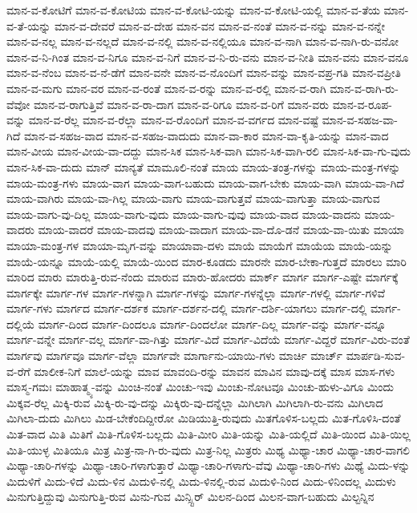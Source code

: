 {ಮಾನ-ವ-ಕೋಟಿಗೆ
ಮಾನ-ವ-ಕೋಟಿಯ
ಮಾನ-ವ-ಕೋಟಿ-ಯನ್ನು
ಮಾನ-ವ-ಕೋಟಿ-ಯಲ್ಲಿ
ಮಾನ-ವ-ತೆಯ
ಮಾನ-ವ-ತೆ-ಯನ್ನು
ಮಾನ-ವ-ದೇವರೆ
ಮಾನ-ವ-ದೇಹ
ಮಾನ-ವನ
ಮಾನ-ವ-ನಂತೆ
ಮಾನ-ವ-ನನ್ನು
ಮಾನ-ವ-ನನ್ನೇ
ಮಾನ-ವ-ನಲ್ಲ
ಮಾನ-ವ-ನಲ್ಲದೆ
ಮಾನ-ವ-ನಲ್ಲಿ
ಮಾನ-ವ-ನಲ್ಲಿಯೂ
ಮಾನ-ವ-ನಾಗಿ
ಮಾನ-ವ-ನಾಗಿ-ರು-ವನೋ
ಮಾನ-ವ-ನಿ-ಗಿಂತ
ಮಾನ-ವ-ನಿಗೂ
ಮಾನ-ವ-ನಿಗೆ
ಮಾನ-ವ-ನಿ-ರು-ವನು
ಮಾನ-ವ-ನೀತಿ
ಮಾನ-ವನು
ಮಾನ-ವನೂ
ಮಾನ-ವ-ನೆಂಬ
ಮಾನ-ವ-ನೆ-ಡೆಗೆ
ಮಾನ-ವನೇ
ಮಾನ-ವ-ನೊಂದಿಗೆ
ಮಾನ-ವನ್ನು
ಮಾನ-ವಪ್ರ-ಗತಿ
ಮಾನ-ವಪ್ರೀತಿ
ಮಾನ-ವ-ಮಗು
ಮಾನ-ವರ
ಮಾನ-ವ-ರಂತೆ
ಮಾನ-ವ-ರನ್ನು
ಮಾನ-ವ-ರಲ್ಲಿ
ಮಾನ-ವ-ರಾಗಿ
ಮಾನ-ವ-ರಾಗಿ-ರು-ವೆವೋ
ಮಾನ-ವ-ರಾಗುತ್ತಿವೆ
ಮಾನ-ವ-ರಾ-ದಾಗ
ಮಾನ-ವ-ರಿಗೂ
ಮಾನ-ವ-ರಿಗೆ
ಮಾನ-ವರು
ಮಾನ-ವ-ರೂಪ-ವನ್ನು
ಮಾನ-ವ-ರೆಲ್ಲ
ಮಾನ-ವ-ರೆಲ್ಲಾ
ಮಾನ-ವ-ರೊಂದಿಗೆ
ಮಾನ-ವ-ವರ್ಗದ
ಮಾನ-ವಷ್ಟೆ
ಮಾನ-ವ-ಸಹಜ-ವಾ-ಗಿದೆ
ಮಾನ-ವ-ಸಹಜ-ವಾದ
ಮಾನ-ವ-ಸಹಜ-ವಾದುದು
ಮಾನ-ವಾ-ಕಾರ
ಮಾನ-ವಾ-ಕೃತಿ-ಯನ್ನು
ಮಾನ-ವಾದ
ಮಾನ-ವೀಯ
ಮಾನ-ವೀಯ-ವಾ-ದದ್ದು
ಮಾನ-ಸಿಕ
ಮಾನ-ಸಿಕ-ವಾಗಿ
ಮಾನ-ಸಿಕ-ವಾಗಿ-ರಲಿ
ಮಾನ-ಸಿಕ-ವಾ-ಗು-ವುದು
ಮಾನ-ಸಿಕ-ವಾ-ದುದು
ಮಾನ್
ಮಾನ್ಯತೆ
ಮಾಮೂಲಿ-ನಂತೆ
ಮಾಯ
ಮಾಯ-ತಂತ್ರ-ಗಳನ್ನು
ಮಾಯ-ಮಂತ್ರ-ಗಳನ್ನು
ಮಾಯ-ಮಂತ್ರ-ಗಳು
ಮಾಯ-ವಾಗ
ಮಾಯ-ವಾಗ-ಬಹುದು
ಮಾಯ-ವಾಗ-ಬೇಕು
ಮಾಯ-ವಾಗಿ
ಮಾಯ-ವಾ-ಗಿದೆ
ಮಾಯ-ವಾಗಿರು
ಮಾಯ-ವಾ-ಗಿಲ್ಲ
ಮಾಯ-ವಾಗು
ಮಾಯ-ವಾಗುತ್ತವೆ
ಮಾಯ-ವಾಗುತ್ತಾ
ಮಾಯ-ವಾಗುವ
ಮಾಯ-ವಾಗು-ವು-ದಿಲ್ಲ
ಮಾಯ-ವಾಗು-ವುದು
ಮಾಯ-ವಾಗು-ವುವು
ಮಾಯ-ವಾದ
ಮಾಯ-ವಾದನು
ಮಾಯ-ವಾದರು
ಮಾಯ-ವಾದರೆ
ಮಾಯ-ವಾದವು
ಮಾಯ-ವಾದಾಗ
ಮಾಯ-ವಾ-ದೊ-ಡನೆ
ಮಾಯ-ವಾ-ಯಿತು
ಮಾಯಾ
ಮಾಯಾ-ಮಂತ್ರ-ಗಳ
ಮಾಯಾ-ಮೃಗ-ವನ್ನು
ಮಾಯಾವಾ-ದಳು
ಮಾಯೆ
ಮಾಯೆಗೆ
ಮಾಯೆಯ
ಮಾಯೆ-ಯನ್ನು
ಮಾಯೆ-ಯನ್ನೂ
ಮಾಯೆ-ಯಲ್ಲಿ
ಮಾಯೆ-ಯಿಂದ
ಮಾರ-ಕೂಡದು
ಮಾರನೇ
ಮಾರ-ಬೇಕಾ-ಗುತ್ತದೆ
ಮಾರಲು
ಮಾರಿ
ಮಾರಿದ
ಮಾರು
ಮಾರುತ್ತಿ-ರುವ-ನೆಂದು
ಮಾರುವ
ಮಾರು-ಹೋದರು
ಮಾರ್ಕ್
ಮಾರ್ಗ
ಮಾರ್ಗ-ಎಷ್ಟೇ
ಮಾರ್ಗಕ್ಕೆ
ಮಾರ್ಗಕ್ಕೇ
ಮಾರ್ಗ-ಗಳ
ಮಾರ್ಗ-ಗಳನ್ನಾಗಿ
ಮಾರ್ಗ-ಗಳನ್ನು
ಮಾರ್ಗ-ಗಳನ್ನೆಲ್ಲಾ
ಮಾರ್ಗ-ಗಳಲ್ಲಿ
ಮಾರ್ಗ-ಗಳಿವೆ
ಮಾರ್ಗ-ಗಳು
ಮಾರ್ಗದ
ಮಾರ್ಗ-ದರ್ಶಕ
ಮಾರ್ಗ-ದರ್ಶನ-ದಲ್ಲಿ
ಮಾರ್ಗ-ದರ್ಶಿ-ಯಾಗಲು
ಮಾರ್ಗ-ದಲ್ಲಿ
ಮಾರ್ಗ-ದಲ್ಲಿಯೆ
ಮಾರ್ಗ-ದಿಂದ
ಮಾರ್ಗ-ದಿಂದಲೂ
ಮಾರ್ಗ-ದಿಂದಲೋ
ಮಾರ್ಗ-ದಿಲ್ಲ
ಮಾರ್ಗ-ವನ್ನು
ಮಾರ್ಗ-ವನ್ನೂ
ಮಾರ್ಗ-ವನ್ನೇ
ಮಾರ್ಗ-ವಲ್ಲ
ಮಾರ್ಗ-ವಾ-ಗಿತ್ತು
ಮಾರ್ಗ-ವಿದೆ
ಮಾರ್ಗ-ವಿದೆಯೆ
ಮಾರ್ಗ-ವಿದ್ದರೆ
ಮಾರ್ಗ-ವಿರು-ವಂತೆ
ಮಾರ್ಗವು
ಮಾರ್ಗವೂ
ಮಾರ್ಗ-ವೆಲ್ಲಾ
ಮಾರ್ಗವೇ
ಮಾರ್ಗಾನು-ಯಾಯಿ-ಗಳು
ಮಾರ್ಚಿ
ಮಾರ್ಚ್
ಮಾರ್ಪಡಿ-ಸುವ-ವ-ರೆಗೆ
ಮಾಲೀಕ-ನಿಗೆ
ಮಾಲೆ-ಯನ್ನು
ಮಾವ
ಮಾವಂದಿ-ರನ್ನು
ಮಾವನ
ಮಾವಿನ
ಮಾವು-ದಕ್ಕೆ
ಮಾಸ
ಮಾಸ-ಗಳು
ಮಾಸ್ಮ-ಗಮಃ
ಮಾಹಾತ್ಮ್ಯ-ವನ್ನು
ಮಿಂಚಿ-ನಂತೆ
ಮಿಂಚು-ಇವು
ಮಿಂಚು-ನೋಟವೂ
ಮಿಂಚು-ಹುಳು-ವಿಗೂ
ಮಿಂದು
ಮಿಕ್ಕವ-ರೆಲ್ಲ
ಮಿಕ್ಕಿ-ರುವ
ಮಿಕ್ಕಿ-ರು-ವು-ದನ್ನು
ಮಿಕ್ಕಿರು-ವು-ದನ್ನೆಲ್ಲಾ
ಮಿಗಿಲಾಗಿ
ಮಿಗಿಲಾಗಿ-ರು-ವನು
ಮಿಗಿಲಾದ
ಮಿಗಿಲಾ-ದುದು
ಮಿಗಿಲು
ಮಿಡ-ಬೇಕೆಂದಿದ್ದೀರೋ
ಮಿಡಿಯುತ್ತಿ-ರುವುದು
ಮಿತಗೊಳಿಸ-ಬಲ್ಲದು
ಮಿತ-ಗೊಳಿಸಿ-ದಂತೆ
ಮಿತ-ವಾದ
ಮಿತಿ
ಮಿತಿಗೆ
ಮಿತಿ-ಗೊಳಿಸ-ಬಲ್ಲದು
ಮಿತಿ-ಮೀರಿ
ಮಿತಿ-ಯನ್ನು
ಮಿತಿ-ಯಲ್ಲಿದೆ
ಮಿತಿ-ಯಿಂದ
ಮಿತಿ-ಯಿಲ್ಲ
ಮಿತಿ-ಯುಳ್ಳ
ಮಿತಿಯೂ
ಮಿತ್ರ
ಮಿತ್ರ-ನಾ-ಗಿ-ರು-ವುದು
ಮಿತ್ರ-ನಿಲ್ಲ
ಮಿತ್ರರು
ಮಿಥ್ಯ
ಮಿಥ್ಯಾ-ಚಾರ
ಮಿಥ್ಯಾ-ಚಾರ-ವಾಗಲಿ
ಮಿಥ್ಯಾ-ಚಾರಿ-ಗಳನ್ನು
ಮಿಥ್ಯಾ-ಚಾರಿ-ಗಳಾಗುತ್ತಾರೆ
ಮಿಥ್ಯಾ-ಚಾರಿ-ಗಳಾಗು-ವೆವು
ಮಿಥ್ಯಾ-ಚಾರಿ-ಗಳು
ಮಿಥ್ಯೆ
ಮಿದು-ಳನ್ನು
ಮಿದುಳಿಗೆ
ಮಿದು-ಳಿದೆ
ಮಿದು-ಳಿನ
ಮಿದುಳಿ-ನಲ್ಲಿ
ಮಿದು-ಳಿನಲ್ಲಿ-ರುವ
ಮಿದುಳಿ-ನಿಂದ
ಮಿದು-ಳಿನಿಂದಲ್ಲ
ಮಿದುಳು
ಮಿನುಗುತ್ತಿದ್ದುವು
ಮಿನುಗುತ್ತಿ-ರುವ
ಮಿನು-ಗುವ
ಮಿನ್ಸ್ಟಿರ್
ಮಿಲನ-ದಿಂದ
ಮಿಲನ-ವಾಗ-ಬಹುದು
ಮಿಲ್ಟನ್ನಿನ
}
